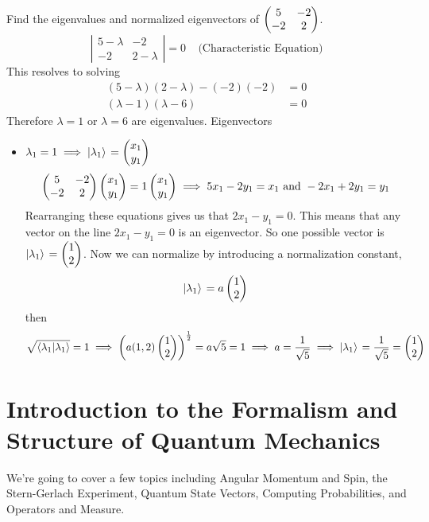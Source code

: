 \documentclass[english, 11pt]{article}
\begin{document}
        \begin{exmp}
          Find the eigenvalues and normalized eigenvectors of $\left(\begin{matrix}5 & -2 \\ -2 & 2\end{matrix}\right)$.
          \newline
          \[ \left| \begin{matrix} 5 - \lambda & -2 \\ -2 & 2-\lambda \end{matrix} \right| = 0 \ \ \ \ \ \mbox{(Characteristic Equation)} \]
          This resolves to solving
          \begin{align*}
            (5-\lambda)(2-\lambda) - (-2)(-2) & = 0 \\
            (\lambda - 1)(\lambda - 6) & = 0
          \end{align*}
          Therefore $\lambda = 1$ or $\lambda = 6$ are eigenvalues. Eigenvectors
          \begin{itemize}
            \item $\lambda_1 = 1 \implies \left| \lambda_1 \rangle \right. = \left(\begin{matrix}x_1 \\ y_1\end{matrix}\right)$
            \[ \left(\begin{matrix}5 & -2 \\ -2 & 2\end{matrix}\right)\left(\begin{matrix}x_1 \\ y_1\end{matrix}\right) = 1 \left(\begin{matrix}x_1 \\ y_1\end{matrix}\right) \implies 5x_1 - 2y_1 = x_1 \mbox{ and } -2x_1 + 2y_1 = y_1 \]
            Rearranging these equations gives us that $2x_1 - y_1 = 0$. This means that any vector on the line $2x_1 - y_1 = 0$ is an eigenvector. So one possible vector is $\left| \lambda_1 \rangle \right. = \left(\begin{matrix}1 \\ 2\end{matrix}\right)$. Now we can normalize by introducing a normalization constant,
            \[ \left| \lambda_1 \rangle \right. = a \left(\begin{matrix}1 \\ 2\end{matrix}\right) \]
            then
            \[ \sqrt{\langle \lambda_1 | \lambda_1 \rangle} = 1 \implies \left(a(1,2)\left(\begin{matrix}1 \\ 2\end{matrix}\right) \right)^{\frac{1}{2}} = a\sqrt{5} = 1 \implies a = \frac{1}{\sqrt{5}} \implies \left| \lambda_1 \rangle \right. = \frac{1}{\sqrt{5}} = \left(\begin{matrix}1 \\ 2\end{matrix}\right) \]
          \end{itemize}
        \end{exmp}

   \section{Introduction to the Formalism and Structure of Quantum Mechanics}

     We're going to cover a few topics including Angular Momentum and Spin, the Stern-Gerlach Experiment, Quantum State Vectors, Computing Probabilities, and Operators and Measure.
\end{document}
